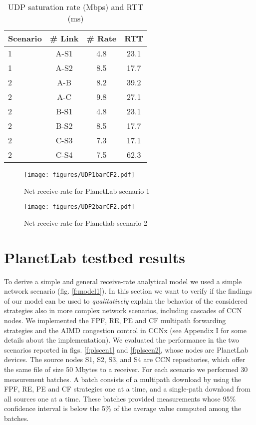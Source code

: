 \documentclass{sig-alternate-10pt}
\begin{document}
\begin{table}
    \centering
    \caption{UDP saturation rate (Mbps) and RTT (ms)}
    \label{table:1}
    \begin{tabular}{l c c c}
Scenario & \# Link & \# Rate & RTT \\ 
    \hline
    \hline
    1 & A-S1  & 4.8 & 23.1 \\ 
    1 & A-S2  & 8.5 & 17.7 \\ 
    2 & A-B  & 8.2 & 39.2 \\ 
    2 & A-C  & 9.8 & 27.1 \\
    2 & B-S1  & 4.8 & 23.1 \\ 
    2 & B-S2  & 8.5 & 17.7 \\ 
    2 & C-S3  & 7.3 & 17.1 \\ 
    2 & C-S4  & 7.5 & 62.3 \\
    
    \end{tabular}
    \vspace{-10pt}
\end{table}

\begin{figure}[t]
\centering
\texttt{[image: figures/UDP1barCF2.pdf]}
\caption{Net receive-rate for PlanetLab scenario 1}
\label{f:plrate1}
\vspace{-10pt}
\end{figure}

\begin{figure}[t]
\centering
\texttt{[image: figures/UDP2barCF2.pdf]}
\caption{Net receive-rate for Planetlab scenario 2}
\label{f:plrate2}
\vspace{-10pt}
\end{figure}

\section{PlanetLab testbed results}
To derive a simple and general receive-rate analytical model we used a simple network scenario (fig. \ref{f:model1}). In this section we want to verify if the findings of our model can be used to \emph{qualitatively} explain the behavior of the considered strategies also in more complex network scenarios, including cascades of CCN nodes.     
We implemented the FPF, RE, PE and CF multipath forwarding strategies and the AIMD congestion control in CCNx (see Appendix I for some details about the implementation). We evaluated the performance in the two scenarios reported in figs. \ref{f:plscen1} and \ref{f:plscen2}, whose nodes are PlanetLab devices. The source nodes S1, S2, S3, and S4 are CCN repositories, which offer the same file of size 50 Mbytes to a receiver. For each scenario we performed 30 measurement batches. A batch consists of a multipath download by using the FPF, RE, PE and CF strategies one at a time, and a single-path download from all sources one at a time. These batches provided measurements whose 95\% confidence interval is below the 5\% of the average value computed among the batches. 
\end{document}
